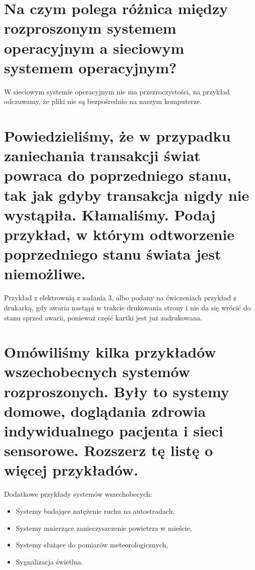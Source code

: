 \documentclass[10pt,a4paper]{article}
\begin{document}
\section{\normalsize{Na czym polega różnica między rozproszonym systemem operacyjnym a sieciowym systemem operacyjnym?}}
W sieciowym systemie operacyjnym nie ma przezroczystości, na przykład odczuwamy, że pliki nie są bezpośrednio na naszym komputerze.
\section{\normalsize{Powiedzieliśmy, że w przypadku zaniechania transakcji świat powraca do poprzedniego stanu, tak jak gdyby transakcja nigdy nie wystąpiła. Kłamaliśmy. Podaj przykład, w którym odtworzenie poprzedniego stanu świata jest niemożliwe.}}
Przykład z elektrownią z zadania 3, albo podany na ćwiczeniach przykład z drukarką, gdy awaria nastąpi w trakcie drukowania strony i nie da się wrócić do stanu sprzed awarii, ponieważ część kartki jest już zadrukowana.
\section{\normalsize{Omówiliśmy kilka przykładów wszechobecnych systemów rozproszonych. Były to systemy domowe, doglądania zdrowia indywidualnego pacjenta i sieci sensorowe. Rozszerz tę listę o więcej przykładów.}}
Dodatkowe przykłady systemów wszechobecych:
\begin{itemize}
\item{Systemy badające natężenie ruchu na autostradach,}
\item{Systemy mnierzące zanieczyszczenie powietrza w mieście,}
\item{Systemy służące do pomiarów meteorologicznych,}
\item{Sygnalizacja świetlna.}
\end{itemize}
\end{document}

